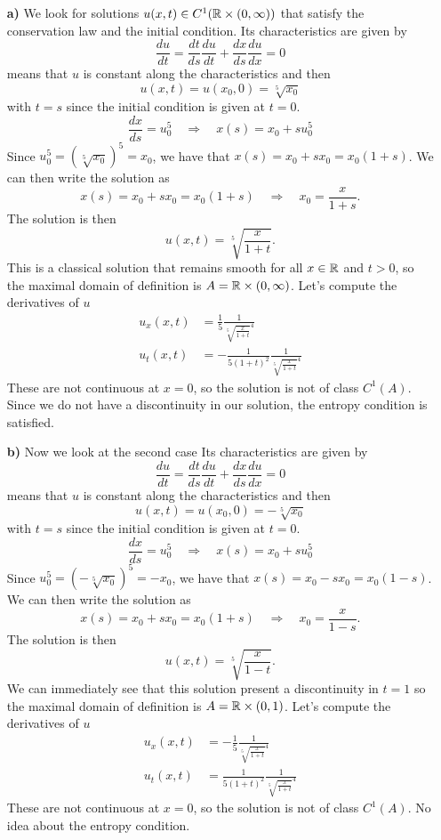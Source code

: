 \begin{enumerate}
    \item[\textbf{a)}] We look for solutions \(u(x, t) \in C^1(\mathbb{R} \times (0, \infty))\) that satisfy the conservation law and the initial condition. 
    Its characteristics are given by
    \[
        \frac{du}{dt} = \frac{dt}{ds} \frac{du}{dt} + \frac{dx}{ds} \frac{du}{dx} = 0
    \]
    means that \(u\) is constant along the characteristics and then 
    \[
        u(x,t) = u(x_0,0) = \sqrt[5]{x_0} 
    \]
    with \(t=s\) since the initial condition is given at \(t=0\). 
    \[
        \frac{dx}{ds} = u_0^5 \quad \Rightarrow \quad x(s) = x_0 + s u_0^5
    \]
    Since \(u_0^5 = (\sqrt[5]{x_0})^5 = x_0\), we have that \(x(s) = x_0 + s x_0 = x_0(1+s)\). We can then write the solution as 
    \[
        x(s) = x_0 + s x_0 = x_0(1+s) \quad \Rightarrow \quad x_0 = \frac{x}{1+s}.
    \]
    The solution is then
    \[
        u(x,t) = \sqrt[5]{\frac{x}{1+t}}.
    \]
    This is a classical solution that remains smooth for all \(x \in \mathbb{R}\) and \(t > 0\), so the maximal domain of definition is \(A = \mathbb{R} \times (0, \infty)\). Let's compute the derivatives of \(u\)
        \begin{align*}
            u_x(x,t) &= \frac{1}{5} \frac{1}{\sqrt[5]{\frac{x}{1+t}}^4} \\
            u_t(x,t) &= -\frac{1}{5(1+t)^2} \frac{1}{\sqrt[5]{\frac{x}{1+t}}^4}
        \end{align*}
    These are not continuous at \(x=0\), so the solution is not of class \(C^1(A)\). Since we do not have a discontinuity in our solution, the entropy condition is satisfied.
    \item[\textbf{b)}] Now we look at the second case
    Its characteristics are given by
    \[
        \frac{du}{dt} = \frac{dt}{ds} \frac{du}{dt} + \frac{dx}{ds} \frac{du}{dx} = 0
    \]
    means that \(u\) is constant along the characteristics and then 
    \[
        u(x,t) = u(x_0,0) = -\sqrt[5]{x_0} 
    \]
    with \(t=s\) since the initial condition is given at \(t=0\). 
    \[
        \frac{dx}{ds} = u_0^5 \quad \Rightarrow \quad x(s) = x_0 + s u_0^5
    \]
    Since \(u_0^5 = (-\sqrt[5]{x_0})^5 = -x_0\), we have that \(x(s) = x_0 - s x_0 = x_0(1-s)\). We can then write the solution as 
    \[
        x(s) = x_0 + s x_0 = x_0(1+s) \quad \Rightarrow \quad x_0 = \frac{x}{1-s}.
    \]
    The solution is then
    \[
        u(x,t) = \sqrt[5]{\frac{x}{1-t}}.
    \]
    We can immediately see that this solution present a discontinuity in \(t=1\) so the maximal domain of definition is \(A = \mathbb{R} \times (0, 1)\). Let's compute the derivatives of \(u\)
        \begin{align*}
            u_x(x,t) &= -\frac{1}{5} \frac{1}{\sqrt[5]{\frac{x}{1+t}}^4} \\
            u_t(x,t) &= \frac{1}{5(1+t)^2} \frac{1}{\sqrt[5]{\frac{x}{1+t}}^4}
        \end{align*}
    These are not continuous at \(x=0\), so the solution is not of class \(C^1(A)\). No idea about the entropy condition.
    \end{enumerate}

